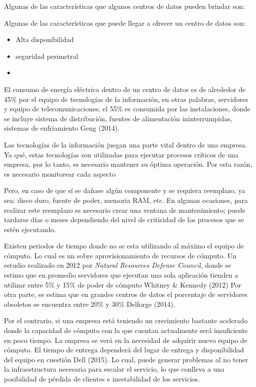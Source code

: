 \documentclass[12pt,twoside]{reedthesis}
\theoremstyle{definition}
\theoremstyle{definition}
\theoremstyle{definition}
\theoremstyle{remark}
\begin{document}
Algunas de las características que algunos centros de datos pueden
brindar son:

Algunas de las características que puede llegar a ofrecer un centro de
datos son:
\begin{itemize}
\item
  Alta disponibilidad
\item
  seguridad perimetral
\item
\end{itemize}
El consumo de energía eléctrica dentro de un centro de datos es de
alrededor de 45\% por el equipo de tecnologías de la información, en
otras palabras, servidores y equipo de telecomunicaciones; el 55\% es
consumida por las instalaciones, donde se incluye sistema de
distribución, fuentes de alimentación ininterrumpidas, sistemas de
enfriamiento Geng (2014).

Las tecnologías de la información juegan una parte vital dentro de una
empresa. Ya qué, estas tecnologías son utilizadas para ejecutar procesos
críticos de una empresa, por lo tanto, es necesario mantener su óptima
operación. Por esta razón, es necesario monitorear cada aspecto

Pero, en caso de que sí se dañase algún componente y se requiera
reemplazo, ya sea: disco duro, fuente de poder, memoria RAM, etc. En
algunas ocasiones, para realizar este reemplazo es necesario crear una
ventana de mantenimiento; puede tardarse días o meses dependiendo del
nivel de criticidad de los procesos que se estén ejecutando.

Existen periodos de tiempo donde no se esta utilizando al máximo el
equipo de cómputo. Lo cual es un sobre aprovisionamiento de recursos de
cómputo. Un estudio realizado en 2012 por \emph{Natural Resources
Defense Council}, donde se estimo que en promedio servidores que
ejecutan una sola aplicación tienden a utilizar entre 5\% y 15\% de
poder de cómputo Whitney \& Kennedy (2012) Por otra parte, se estima que
en grandes centros de datos el porcentaje de servidores obsoletos se
encuentra entre 20\% y 30\% Delforge (2014).

Por el contrario, si una empresa está teniendo un crecimiento bastante
acelerado donde la capacidad de cómputo con la que cuentan actualmente
será insuficiente en poco tiempo. La empresa se verá en la necesidad de
adquirir nuevo equipo de cómputo. El tiempo de entrega dependerá del
lugar de entrega y disponibilidad del equipo en cuestión Dell (2015). Lo
cual, puede generar problemas al no tener la infraestructura necesaria
para escalar el servicio, lo que conlleva a una posibilidad de pérdida
de clientes e inestabilidad de los servicios.
\end{document}
